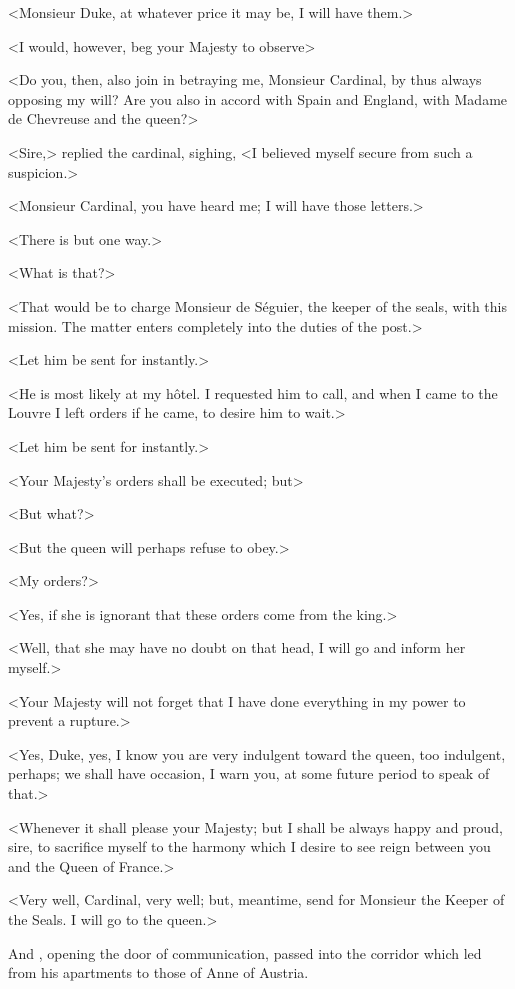 <Monsieur Duke, at whatever price it may be, I will have them.> 

<I would, however, beg your Majesty to observe\longdash> 

<Do you, then, also join in betraying me, Monsieur Cardinal, by thus always opposing my will? Are you also in accord with Spain and England, with Madame de Chevreuse and the queen?> 

<Sire,> replied the cardinal, sighing, <I believed myself secure from such a suspicion.> 

<Monsieur Cardinal, you have heard me; I will have those letters.> 

<There is but one way.> 

<What is that?> 

<That would be to charge Monsieur de Séguier, the keeper of the seals, with this mission. The matter enters completely into the duties of the post.> 

<Let him be sent for instantly.> 

<He is most likely at my hôtel. I requested him to call, and when I came to the Louvre I left orders if he came, to desire him to wait.> 

<Let him be sent for instantly.> 

<Your Majesty's orders shall be executed; but\longdash> 

<But what?> 

<But the queen will perhaps refuse to obey.> 

<My orders?> 

<Yes, if she is ignorant that these orders come from the king.> 

<Well, that she may have no doubt on that head, I will go and inform her myself.> 

<Your Majesty will not forget that I have done everything in my power to prevent a rupture.> 

<Yes, Duke, yes, I know you are very indulgent toward the queen, too indulgent, perhaps; we shall have occasion, I warn you, at some future period to speak of that.> 

<Whenever it shall please your Majesty; but I shall be always happy and proud, sire, to sacrifice myself to the harmony which I desire to see reign between you and the Queen of France.> 

<Very well, Cardinal, very well; but, meantime, send for Monsieur the Keeper of the Seals. I will go to the queen.> 

And , opening the door of communication, passed into the corridor which led from his apartments to those of Anne of Austria. 

